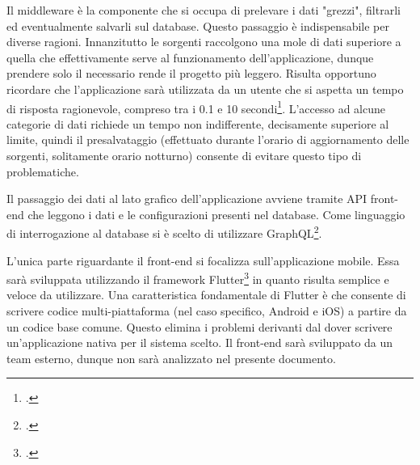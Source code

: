 \documentclass[./main.tex]{subfiles}
\begin{document}
Il middleware è la componente che si occupa di prelevare i dati "grezzi", filtrarli ed eventualmente salvarli sul database. Questo passaggio è indispensabile per diverse ragioni. Innanzitutto le sorgenti raccolgono una mole di dati superiore a quella che effettivamente serve al funzionamento dell'applicazione, dunque prendere solo il necessario rende il progetto più leggero. Risulta opportuno ricordare che l'applicazione sarà utilizzata da un utente che si aspetta un tempo di risposta ragionevole, compreso tra i 0.1 e 10 secondi\footcite[268-276]{Miller68-0}. L'accesso ad alcune categorie di dati richiede un tempo non indifferente, decisamente superiore al limite, quindi il presalvataggio (effettuato durante l'orario di aggiornamento delle sorgenti, solitamente orario notturno) consente di evitare questo tipo di problematiche.\par

Il passaggio dei dati al lato grafico dell'applicazione avviene tramite API front-end che leggono i dati e le configurazioni presenti nel database. Come linguaggio di interrogazione al database si è scelto di utilizzare GraphQL\footcite[\url{https://graphql.org/}]{website-graphql}.\par

L'unica parte riguardante il front-end si focalizza sull'applicazione mobile. Essa sarà sviluppata utilizzando il framework Flutter\footcite[\url{https://flutter.dev/}]{website-flutter} in quanto risulta semplice e veloce da utilizzare. Una caratteristica fondamentale di Flutter è che consente di scrivere codice multi-piattaforma (nel caso specifico, Android e iOS) a partire da un codice base comune. Questo elimina i problemi derivanti dal dover scrivere un'applicazione nativa per il sistema scelto. Il front-end sarà sviluppato da un team esterno, dunque non sarà analizzato nel presente documento.\par
\end{document}
